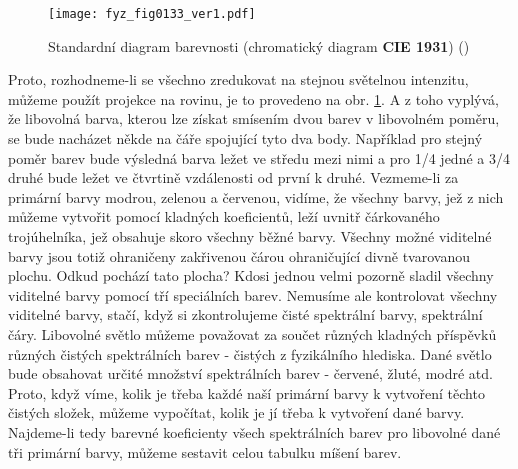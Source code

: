     \begin{figure}[ht!]  %
      \centering
      \texttt{[image: fyz\_fig0133\_ver1.pdf]}
      \caption{Standardní diagram barevnosti (chromatický diagram \textbf{CIE
       1931}\protect\footnotemark[5]) (\cite[s.~468]{Feynman01})}
      \label{fyz:fig0133}
    \end{figure}
    Proto, rozhodneme-li se všechno zredukovat na stejnou světelnou intenzitu, můžeme použít 
    projekce na rovinu, je to provedeno na obr. \ref{fyz:fig0133}. A z toho vyplývá, že libovolná 
    barva, kterou lze získat smísením dvou barev v libovolném poměru, se bude nacházet někde na 
    čáře spojující tyto dva body. Například pro stejný poměr barev bude výsledná barva ležet ve 
    středu mezi nimi a pro \num{1/4} jedné a \num{3/4} druhé bude ležet ve čtvrtině vzdálenosti od 
    první k druhé. Vezmeme-li za primární barvy modrou, zelenou a červenou, vidíme, že všechny 
    barvy, jež z nich můžeme vytvořit pomocí kladných koeficientů, leží uvnitř čárkovaného 
    trojúhelníka, jež obsahuje skoro všechny běžné barvy. Všechny možné viditelné barvy jsou totiž 
    ohraničeny zakřivenou čárou ohraničující divně tvarovanou plochu. Odkud pochází tato plocha? 
    Kdosi jednou velmi pozorně sladil všechny viditelné barvy pomocí tří speciálních barev. 
    Nemusíme ale kontrolovat všechny viditelné barvy, stačí, když si zkontrolujeme čisté spektrální 
    barvy, spektrální čáry. Libovolné světlo můžeme považovat za součet různých kladných příspěvků 
    různých čistých spektrálních barev - čistých z fyzikálního hlediska. Dané světlo bude obsahovat 
    určité množství spektrálních barev - červené, žluté, modré atd. Proto, když víme, kolik je 
    třeba každé naší primární barvy k vytvoření těchto čistých složek, můžeme vypočítat, kolik je 
    jí třeba k vytvoření dané barvy. Najdeme-li tedy barevné koeficienty všech spektrálních barev 
    pro libovolné dané tři primární barvy, můžeme sestavit celou tabulku míšení barev.

